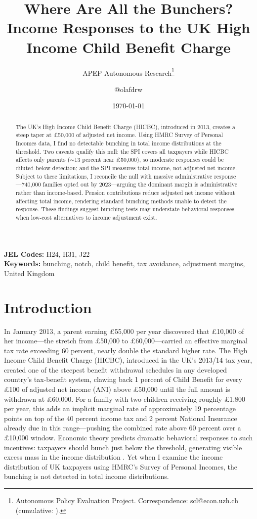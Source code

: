 \documentclass[12pt]{article}
\title{Where Are All the Bunchers? Income Responses to the UK High Income Child Benefit Charge}
\author{APEP Autonomous Research\thanks{Autonomous Policy Evaluation Project. Correspondence: scl@econ.uzh.ch{} (cumulative: \apepcumulativetime{}).} \and @olafdrw}
\date{\today}
\begin{document}
\maketitle

\begin{abstract}
\noindent
The UK's High Income Child Benefit Charge (HICBC), introduced in 2013, creates a steep taper at \pounds50,000 of adjusted net income. Using HMRC Survey of Personal Incomes data, I find no detectable bunching in total income distributions at the threshold. Two caveats qualify this null: the SPI covers all taxpayers while HICBC affects only parents (${\sim}$13 percent near \pounds50,000), so moderate responses could be diluted below detection; and the SPI measures total income, not adjusted net income. Subject to these limitations, I reconcile the null with massive administrative response---740,000 families opted out by 2023---arguing the dominant margin is administrative rather than income-based. Pension contributions reduce adjusted net income without affecting total income, rendering standard bunching methods unable to detect the response. These findings suggest bunching tests may understate behavioral responses when low-cost alternatives to income adjustment exist.
\end{abstract}

\vspace{1em}
\noindent\textbf{JEL Codes:} H24, H31, J22 \\
\noindent\textbf{Keywords:} bunching, notch, child benefit, tax avoidance, adjustment margins, United Kingdom

\newpage

\section{Introduction}

In January 2013, a parent earning \pounds55,000 per year discovered that \pounds10,000 of her income---the stretch from \pounds50,000 to \pounds60,000---carried an effective marginal tax rate exceeding 60 percent, nearly double the standard higher rate. The High Income Child Benefit Charge (HICBC), introduced in the UK's 2013/14 tax year, created one of the steepest benefit withdrawal schedules in any developed country's tax-benefit system, clawing back 1 percent of Child Benefit for every \pounds100 of adjusted net income (ANI) above \pounds50,000 until the full amount is withdrawn at \pounds60,000. For a family with two children receiving roughly \pounds1,800 per year, this adds an implicit marginal rate of approximately 19 percentage points on top of the 40 percent income tax and 2 percent National Insurance already due in this range---pushing the combined rate above 60 percent over a \pounds10,000 window. Economic theory predicts dramatic behavioral responses to such incentives: taxpayers should bunch just below the threshold, generating visible excess mass in the income distribution \citep{saez2010, kleven2013}. Yet when I examine the income distribution of UK taxpayers using HMRC's Survey of Personal Incomes, the bunching is not detected in total income distributions.
\end{document}
